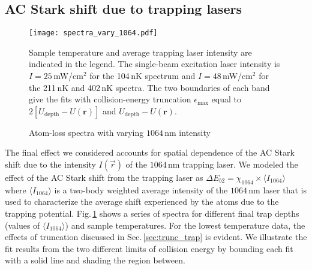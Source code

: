 \subsection{AC Stark shift due to trapping lasers}
	\begin{figure}
	 \centerline{
	 \texttt{[image: spectra\_vary\_1064.pdf]}}
  \caption{Atom-loss spectra with varying $1064$\,nm intensity}{Sample temperature and average trapping laser intensity are indicated in the legend. The single-beam excitation laser intensity is $I=25$\,mW/cm$^{2}$ for the 104\,nK spectrum and $I=48$\,mW/cm$^{2}$ for the 211\,nK and 402\,nK spectra. The two boundaries of each band give the fits with collision-energy truncation
$\epsilon_{\text{max}}$ equal to $2[U_{\text{depth}}-U(\mathbf{r})]$ and $U_{\text{depth}}-U(\mathbf{r})$.}
  	\label{fig:Spectraminus9MHzVaryTrapCold}
	\end{figure}
The final effect we considered accounts for spatial dependence of the AC Stark shift due to the intensity $I(\vec{r})$ of the $1064$\,nm trapping laser.
We modeled the effect of the AC Stark shift from the trapping laser as $\Delta E_{b2} = \chi_{1064} \times \langle I_{1064} \rangle$ where $\langle I_{1064} \rangle $ is a two-body weighted average intensity of the $1064$\,nm laser that is used to characterize the average shift experienced by the atoms due to the trapping potential.
Fig.\,\ref{fig:Spectraminus9MHzVaryTrapCold} shows a series of spectra for different final trap depths (values of $\langle I_{1064} \rangle $) and sample temperatures.
For the lowest temperature data, the effects of truncation discussed in Sec.\,\ref{sec:trunc_trap} is evident.
We illustrate the fit results from the two different limits of collision energy by bounding each fit with a solid line and shading the region between.


